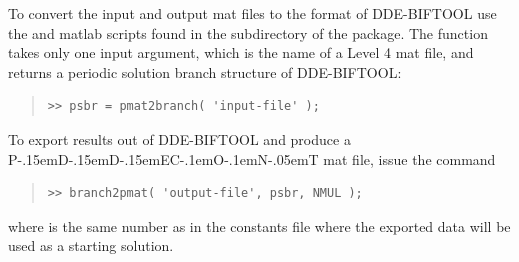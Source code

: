 \documentclass[10pt,a4paper]{ddedoc}
\def\pdde{{P\kern-.15emD\kern-.15emD\kern-.15emE\raisebox{.25ex}{-}C\kern-.1emO\kern-.1emN\kern-.05emT}}
\begin{document}
To convert the input and output {\sc{}mat} files to the format of DDE-BIFTOOL use the
 and  {\sc{}matlab} scripts found in the 
subdirectory of the package. The function  takes only one 
input argument, which is the name of a Level 4 {\sc{}mat} file, and returns a periodic 
solution branch structure of DDE-BIFTOOL:
{ \small \begin{quote} \begin{lstlisting}[frame=single]
>> psbr = pmat2branch( 'input-file' );
\end{lstlisting} \end{quote} } \noindent
To export results out of DDE-BIFTOOL and produce a \pdde{} {\sc{}mat} file, issue the command
{ \small \begin{quote} \begin{lstlisting}[frame=single]
>> branch2pmat( 'output-file', psbr, NMUL );
\end{lstlisting} \end{quote} } \noindent
where  is the same number as in the constants file where the exported data 
will be used as a starting solution.
\end{document}
